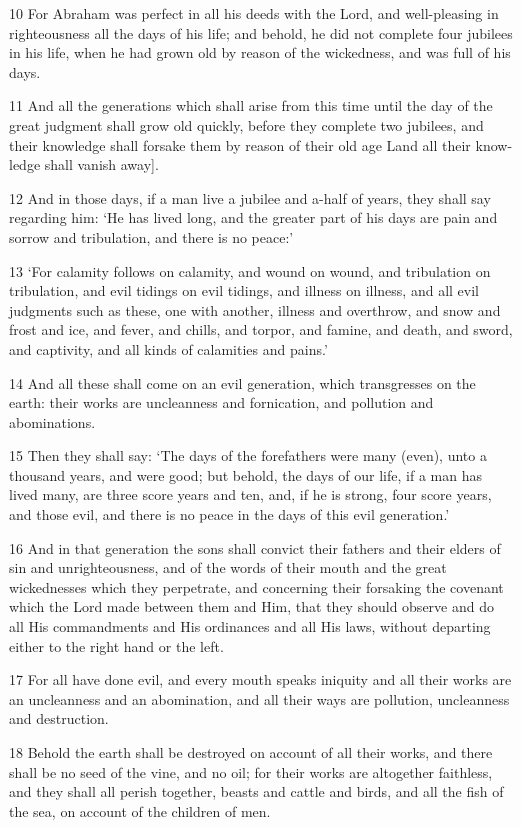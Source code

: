 \par 10 For Abraham was perfect in all his deeds with the Lord, and well-pleasing in righteousness all the days of his life; and behold, he did not complete four jubilees in his life, when he had grown old by reason of the wickedness, and was full of his days.
\par 11 And all the generations which shall arise from this time until the day of the great judgment shall grow old quickly, before they complete two jubilees, and their knowledge shall forsake them by reason of their old age Land all their know- ledge shall vanish away].
\par 12 And in those days, if a man live a jubilee and a-half of years, they shall say regarding him: ‘He has lived long, and the greater part of his days are pain and sorrow and tribulation, and there is no peace:’
\par 13 ‘For calamity follows on calamity, and wound on wound, and tribulation on tribulation, and evil tidings on evil tidings, and illness on illness, and all evil judgments such as these, one with another, illness and overthrow, and snow and frost and ice, and fever, and chills, and torpor, and famine, and death, and sword, and captivity, and all kinds of calamities and pains.’
\par 14 And all these shall come on an evil generation, which transgresses on the earth: their works are uncleanness and fornication, and pollution and abominations.
\par 15 Then they shall say: ‘The days of the forefathers were many (even), unto a thousand years, and were good; but behold, the days of our life, if a man has lived many, are three score years and ten, and, if he is strong, four score years, and those evil, and there is no peace in the days of this evil generation.’
\par 16 And in that generation the sons shall convict their fathers and their elders of sin and unrighteousness, and of the words of their mouth and the great wickednesses which they perpetrate, and concerning their forsaking the covenant which the Lord made between them and Him, that they should observe and do all His commandments and His ordinances and all His laws, without departing either to the right hand or the left.
\par 17 For all have done evil, and every mouth speaks iniquity and all their works are an uncleanness and an abomination, and all their ways are pollution, uncleanness and destruction.
\par 18 Behold the earth shall be destroyed on account of all their works, and there shall be no seed of the vine, and no oil; for their works are altogether faithless, and they shall all perish together, beasts and cattle and birds, and all the fish of the sea, on account of the children of men.
